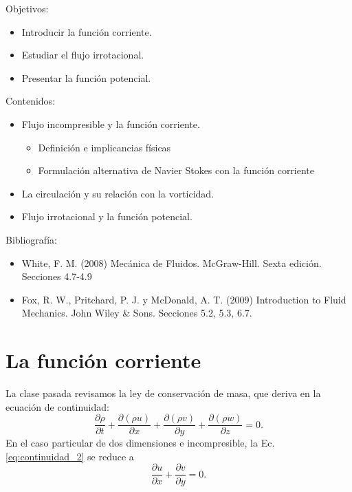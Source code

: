 \begin{framed}

Objetivos:
\begin{itemize}
    \item Introducir la función corriente.
    \item Estudiar el flujo irrotacional. 
    \item Presentar la función potencial.
\end{itemize}

Contenidos:
\begin{itemize}
    \item Flujo incompresible y la función corriente.
    \begin{itemize}
        \item Definición e implicancias físicas
        \item Formulación alternativa de Navier Stokes con la función corriente
    \end{itemize}
    \item La circulación y su relación con la vorticidad.
    \item Flujo irrotacional y la función potencial.
\end{itemize}

Bibliografía:
\begin{itemize}
    \item White, F. M. (2008) Mecánica de Fluidos. McGraw-Hill. Sexta edición. Secciones 4.7-4.9
    \item Fox, R. W., Pritchard, P. J. y McDonald, A. T. (2009) Introduction to Fluid Mechanics. John Wiley \& Sons. Secciones 5.2, 5.3, 6.7.
\end{itemize}
\end{framed}

\section*{La función corriente}

La clase pasada revisamos la ley de conservación de masa, que deriva en la ecuación de continuidad:
%
\begin{equation} \label{eq:continuidad_2}
\frac{\partial \rho}{\partial t} + \frac{\partial(\rho u)}{\partial x} + \frac{\partial(\rho v)}{\partial y} + \frac{\partial(\rho w)}{\partial z} = 0.
\end{equation}
%
En el caso particular de dos dimensiones e incompresible, la Ec. \eqref{eq:continuidad_2} se reduce a
%
\begin{equation} \label{eq:continuidad2D}
\frac{\partial u}{\partial x} + \frac{\partial v}{\partial y} = 0.
\end{equation}

